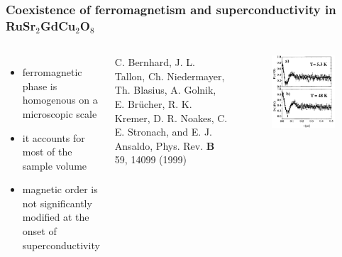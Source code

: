 \documentclass[11pt]{beamer}
\begin{document}
\begin{frame}
	\frametitle{Coexistence of ferromagnetism and superconductivity in RuSr$_2$GdCu$_2$O$_8$}
	
	\begin{columns}
		\begin{itemize}
			\item ferromagnetic phase is homogenous on a microscopic scale \vspace{10pt}
			\item it accounts for most of the sample volume\vspace{10pt}
			\item magnetic order is not significantly modified at the onset of superconductivity
		\end{itemize}
		\vspace{1cm}
		\vfill
		\setlength{\baselineskip}{6pt}      
		\begin{tiny}
			C. Bernhard, J. L. Tallon, Ch. Niedermayer, Th. Blasius, A. Golnik, E. Brücher, R. K. Kremer, D. R. Noakes, C. E. Stronach, and E. J. Ansaldo, Phys. Rev. \textbf{B} 59, 14099 (1999)
		\end{tiny}
		
		\begin{figure}[htbp]
			\centering
			\includegraphics[width=\textwidth]{Bilder/ferromagnetism.png}%
			\caption*{}%
		\end{figure}
	\end{columns}
	
	\vfill
	
	
\end{frame}
\end{document}
